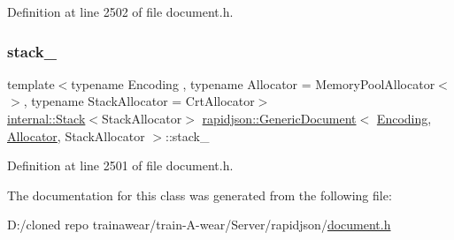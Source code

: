 Definition at line 2502 of file document.\+h.

\mbox{\label{classrapidjson_1_1_generic_document_a21961da965bca1d65007e0b55ca639a8}} 
\subsubsection{\texorpdfstring{stack\_}{stack\_}}
{\footnotesize\ttfamily template$<$typename Encoding , typename Allocator  = Memory\+Pool\+Allocator$<$$>$, typename Stack\+Allocator  = Crt\+Allocator$>$ \\
\mbox{\hyperlink{classrapidjson_1_1internal_1_1_stack}{internal\+::\+Stack}}$<$Stack\+Allocator$>$ \mbox{\hyperlink{classrapidjson_1_1_generic_document}{rapidjson\+::\+Generic\+Document}}$<$ \mbox{\hyperlink{classrapidjson_1_1_encoding}{Encoding}}, \mbox{\hyperlink{classrapidjson_1_1_allocator}{Allocator}}, Stack\+Allocator $>$\+::stack\+\_\+\hspace{0.3cm}{\ttfamily [private]}}



Definition at line 2501 of file document.\+h.



The documentation for this class was generated from the following file\+:\begin{DoxyCompactItemize}
\item 
D\+:/cloned repo trainawear/train-\/\+A-\/wear/\+Server/rapidjson/\mbox{\hyperlink{document_8h}{document.\+h}}\end{DoxyCompactItemize}
